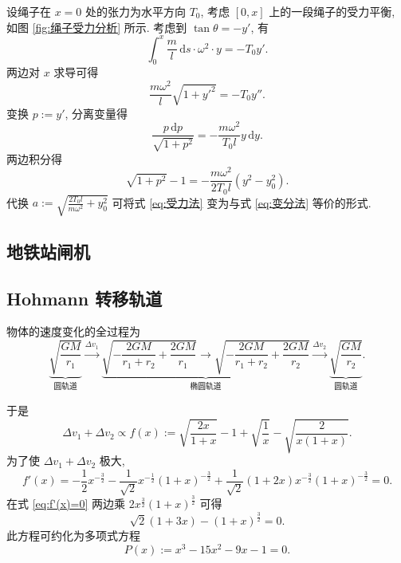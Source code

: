 \documentclass{article}
\begin{document}
设绳子在 $x=0$ 处的张力为水平方向 $T_0$,
考虑 $\left[0,x\right]$ 上的一段绳子的受力平衡, 如图 \ref{fig:绳子受力分析} 所示.
考虑到 $\tan\theta=-y'$, 有
\begin{equation}
	\int_0^x\frac ml\,\mathrm ds\cdot\omega^2\cdot y=-T_0y'.
\end{equation}
两边对 $x$ 求导可得
\begin{equation}
	\frac{m\omega^2}{l}\sqrt{1+y'^2}=-T_0y''.
\end{equation}
变换 $p:=y'$, 分离变量得
\begin{equation}
	\frac{p\,\mathrm dp}{\sqrt{1+p^2}}=-\frac{m\omega^2}{T_0l}y\,\mathrm dy.
\end{equation}
两边积分得
\begin{equation}
	\sqrt{1+p^2}-1=-\frac{m\omega^2}{2T_0l}\left(y^2-y_0^2\right).
	\label{eq:受力法}
\end{equation}
代换 $a:=\sqrt{\frac{2T_0l}{m\omega^2}+y_0^2}$ 可将式 \ref{eq:受力法} 变为与式 \ref{eq:变分法} 等价的形式.

\subsection{地铁站闸机}

\subsection{Hohmann 转移轨道}

物体的速度变化的全过程为
\begin{equation}
	\underbrace{\sqrt{\frac{GM}{r_1}}}_{\text{圆轨道}}\xrightarrow{\Delta v_1}
	\underbrace{\sqrt{-\frac{2GM}{r_1+r_2}+\frac{2GM}{r_1}}
	\rightarrow\sqrt{-\frac{2GM}{r_1+r_2}+\frac{2GM}{r_2}}}_{\text{椭圆轨道}}
	\xrightarrow{\Delta v_2}\underbrace{\sqrt{\frac{GM}{r_2}}}_{\text{圆轨道}}.
\end{equation}

于是
\begin{equation}
	\Delta v_1+\Delta v_2\propto f\!\left(x\right):=
	\sqrt{\frac{2x}{1+x}}-1+\sqrt{\frac1x}-\sqrt{\frac2{x\left(1+x\right)}}.
\end{equation}
为了使 $\Delta v_1+\Delta v_2$ 极大,
\begin{equation}
	f'\!\left(x\right)=-\frac12x^{-\frac32}-\frac1{\sqrt2}x^{-\frac12}\left(1+x\right)^{-\frac32}
	+\frac1{\sqrt2}\left(1+2x\right)x^{-\frac32}\left(1+x\right)^{-\frac32}=0.
	\label{eq:f'(x)=0}
\end{equation}
在式 \ref{eq:f'(x)=0} 两边乘 $2x^{\frac32}\left(1+x\right)^{\frac32}$ 可得
\begin{equation}
	\sqrt2\left(1+3x\right)-\left(1+x\right)^{\frac32}=0.
\end{equation}
此方程可约化为多项式方程
\begin{equation}
	P\!\left(x\right):=x^3-15x^2-9x-1=0.
\end{equation}
\end{document}
